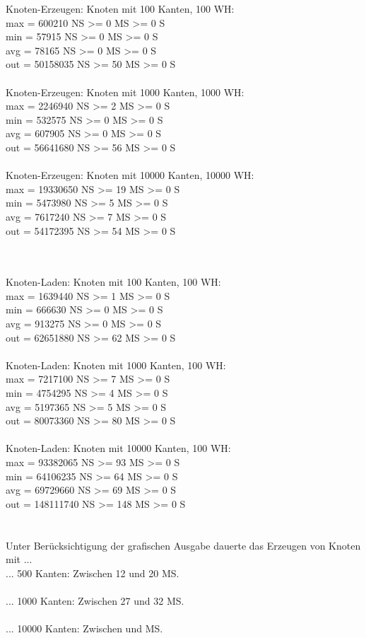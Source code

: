 \noindent
Knoten-Erzeugen: Knoten mit 100 Kanten, 100 WH:\\
max = 600210 NS >= 0 MS >= 0 S\\
min = 57915 NS >= 0 MS >= 0 S\\
avg = 78165 NS >= 0 MS >= 0 S\\
out = 50158035 NS >= 50 MS >= 0 S\\
~\\
Knoten-Erzeugen: Knoten mit 1000 Kanten, 1000 WH:\\
max = 2246940 NS >= 2 MS >= 0 S\\
min = 532575 NS >= 0 MS >= 0 S\\
avg = 607905 NS >= 0 MS >= 0 S\\
out = 56641680 NS >= 56 MS >= 0 S\\
~\\
Knoten-Erzeugen: Knoten mit 10000 Kanten, 10000 WH:\\
max = 19330650 NS >= 19 MS >= 0 S\\
min = 5473980 NS >= 5 MS >= 0 S\\
avg = 7617240 NS >= 7 MS >= 0 S\\
out = 54172395 NS >= 54 MS >= 0 S\\
~\\~\\

\clearpage

\noindent
Knoten-Laden: Knoten mit 100 Kanten, 100 WH:\\
max = 1639440 NS >= 1 MS >= 0 S\\
min = 666630 NS >= 0 MS >= 0 S\\
avg = 913275 NS >= 0 MS >= 0 S\\
out = 62651880 NS >= 62 MS >= 0 S\\
~\\
Knoten-Laden: Knoten mit 1000 Kanten, 100 WH:\\
max = 7217100 NS >= 7 MS >= 0 S\\
min = 4754295 NS >= 4 MS >= 0 S\\
avg = 5197365 NS >= 5 MS >= 0 S\\
out = 80073360 NS >= 80 MS >= 0 S\\
~\\
Knoten-Laden: Knoten mit 10000 Kanten, 100 WH:\\
max = 93382065 NS >= 93 MS >= 0 S\\
min = 64106235 NS >= 64 MS >= 0 S\\
avg = 69729660 NS >= 69 MS >= 0 S\\
out = 148111740 NS >= 148 MS >= 0 S\\
~\\

~\\

\noindent
Unter Berücksichtigung der grafischen Ausgabe dauerte das  Erzeugen von Knoten mit ...\\

\noindent
... 500 Kanten: Zwischen 12 und 20 MS.\\\\
... 1000 Kanten: Zwischen 27 und 32 MS.\\\\
... 10000 Kanten: Zwischen  und  MS.\\\\


